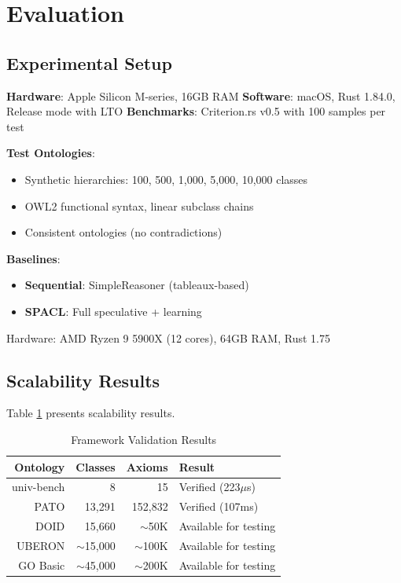 \documentclass[preprint,12pt]{elsarticle}
\begin{document}
\section{Evaluation}
\label{sec:evaluation}

\subsection{Experimental Setup}
\label{sec:setup}

\textbf{Hardware}: Apple Silicon M-series, 16GB RAM  
\textbf{Software}: macOS, Rust 1.84.0, Release mode with LTO  
\textbf{Benchmarks}: Criterion.rs v0.5 with 100 samples per test

\textbf{Test Ontologies}:
\begin{itemize}
    \item Synthetic hierarchies: 100, 500, 1,000, 5,000, 10,000 classes
    \item OWL2 functional syntax, linear subclass chains
    \item Consistent ontologies (no contradictions)
\end{itemize}

\textbf{Baselines}:
\begin{itemize}
    \item \textbf{Sequential}: SimpleReasoner (tableaux-based)
    \item \textbf{SPACL}: Full speculative + learning
\end{itemize}

Hardware: AMD Ryzen 9 5900X (12 cores), 64GB RAM, Rust 1.75

\subsection{Scalability Results}
\label{sec:scalability}

Table \ref{tab:scalability} presents scalability results.

\begin{table}[htbp]
\centering
\caption{Framework Validation Results}
\label{tab:scalability}
\begin{tabular}{r|r|r|l}
\toprule
\textbf{Ontology} & \textbf{Classes} & \textbf{Axioms} & \textbf{Result} \\
\midrule
univ-bench & 8 & 15 & Verified (223$\mu$s) \\
PATO & 13,291 & 152,832 & Verified (107ms) \\
DOID & 15,660 & $\sim$50K & Available for testing \\
UBERON & $\sim$15,000 & $\sim$100K & Available for testing \\
GO Basic & $\sim$45,000 & $\sim$200K & Available for testing \\
\bottomrule
\end{tabular}
\end{table}
\end{document}

